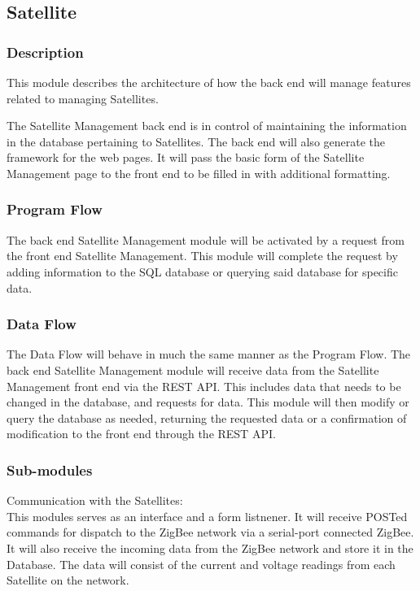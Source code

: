 
\subsection{Satellite}

\subsubsection{Description}

This module describes the architecture of how the back end will manage features related to managing Satellites. 

The Satellite Management back end is in control of maintaining the information in the database pertaining to Satellites. 
The back end will also generate the framework for the web pages. 
It will pass the basic form of the Satellite Management page to the front end to be filled in with additional formatting. 

\subsubsection{Program Flow}

The back end Satellite Management module will be activated by a request from the front end Satellite Management. 
This module will complete the request by adding information to the SQL database or querying said database for specific data. 

\subsubsection{Data Flow}

The Data Flow will behave in much the same manner as the Program Flow. 
The back end Satellite Management module will receive data from the Satellite Management front end via the REST API. 
This includes data that needs to be changed in the database, and requests for data. 
This module will then modify or query the database as needed, 
returning the requested data or a confirmation of modification to the front end through the REST API. 

\subsubsection{Sub-modules}
Communication with the Satellites:\\
This modules serves as an interface and a form listnener. 
It will receive POSTed commands for dispatch to the ZigBee network via a serial-port connected ZigBee. 
It will also receive the incoming data from the ZigBee network and store it in the Database. 
The data will consist of the current and voltage readings from each Satellite on the network. 
